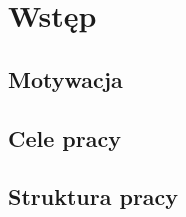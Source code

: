 
\def\filename{wstep}
\chapter{Wstęp}


\section{Motywacja}


\section{Cele pracy}

\section{Struktura pracy}



